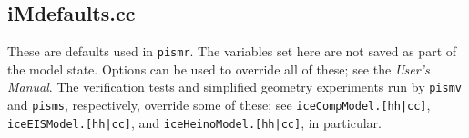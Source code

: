 \documentclass[12pt,final]{amsart}%
\theoremstyle{plain}
\theoremstyle{definition}
\theoremstyle{remark}
\begin{document}
\scriptsize
\begin{quote}

\end{quote}
\normalsize

\subsection*{iMdefaults.cc}  These are defaults used in \texttt{pismr}.  The variables set here are not saved as part of the model state.  Options can be used to override all of these; see the \emph{User's Manual}.  The verification tests and simplified geometry experiments run by \texttt{pismv} and \texttt{pisms}, respectively, override some of these; see \texttt{iceCompModel.[hh|cc]}, \texttt{iceEISModel.[hh|cc]}, and \texttt{iceHeinoModel.[hh|cc]}, in particular.

\scriptsize
\begin{quote}

\end{quote}
\normalsize

\newpage


\end{document}
